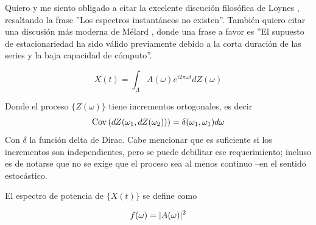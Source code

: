 
%


Quiero y me siento obligado a citar la excelente discuci\'on
filos\'ofica
de Loynes \cite{Loynes68}, resaltando la frase ''Los espectros instant\'aneos no existen''.
Tambi\'en quiero citar una discusi\'on m\'as moderna de M\'elard \cite{Melard89}, donde una
frase a favor es ''El supuesto de estacionariedad ha sido v\'alido previamente debido a la corta
duraci\'on de las series y la baja capacidad de c\'omputo''.


\begin{equation*}
X(t) = \int_{\Lambda} A(\omega) e^{i 2\pi \omega t} dZ(\omega)
\end{equation*}

Donde el proceso $\{ Z(\omega) \}$ tiene incrementos ortogonales, es decir 
\begin{equation*}
\mathrm{Cov}\left( dZ(\omega_1,dZ(\omega_2)) \right) = \delta(\omega_1,\omega_1) d\omega
\end{equation*}
Con $\delta$ la funci\'on delta de Dirac. Cabe mencionar que es suficiente si los incrementos
son independientes, pero se puede debilitar ese requerimiento; incluso es de notarse que no
se exige que el proceso sea al menos continuo --en el sentido estoc\'astico.

El espectro de potencia de $\{X(t)\}$ se define como

\begin{equation*}
f(\omega) = \lvert A(\omega) \rvert^{2}
\end{equation*}

